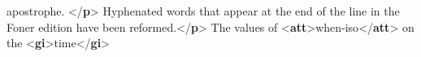 \begin{shaded}
\hspace*{1em}\hspace*{1em}\hspace*{1em}\hspace*{1em}\hspace*{1em}\hspace*{1em}\hspace*{1em}\hspace*{1em} apostrophe. {</\textbf{p}>}\mbox{}\newline 
\hspace*{1em}\hspace*{1em}\mbox{}\newline 
\hspace*{1em}\hspace*{1em}\mbox{}\newline 
\hspace*{1em}\hspace*{1em}\hspace*{1em}Hyphenated words that appear at the\mbox{}\newline 
\hspace*{1em}\hspace*{1em}\hspace*{1em}\hspace*{1em}\hspace*{1em}\hspace*{1em}\hspace*{1em}\hspace*{1em} end of the line in the Foner edition have been reformed.{</\textbf{p}>}\mbox{}\newline 
\hspace*{1em}\hspace*{1em}\mbox{}\newline 
\hspace*{1em}\hspace*{1em}\mbox{}\newline 
\hspace*{1em}\hspace*{1em}\hspace*{1em}The values of {<\textbf{att}>}when-iso{</\textbf{att}>} on the {<\textbf{gi}>}time{</\textbf{gi}>}\mbox{}\newline 

\end{shaded}
